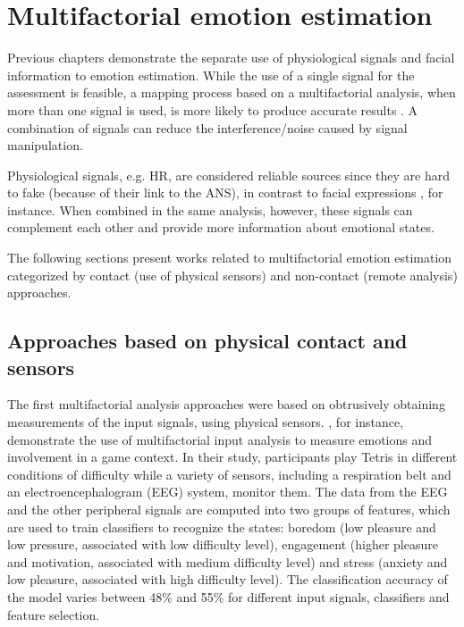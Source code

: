 \chapter{Multifactorial emotion estimation}
\label{ch:literature-multifactorial}

Previous chapters demonstrate the separate use of physiological signals and facial information to emotion estimation. While the use of a single signal for the assessment is feasible, a mapping process based on a multifactorial analysis, when more than one signal is used, is more likely to produce accurate results \parencite{kukolja2014comparative}. A combination of signals can reduce the interference/noise caused by signal manipulation.

Physiological signals, e.g. HR, are considered reliable sources since they are hard to fake (because of their link to the ANS), in contrast to facial expressions \parencite{Landowska}, for instance. When combined in the same analysis, however, these signals can complement each other and provide more information about emotional states.

The following sections present works related to multifactorial emotion estimation categorized by contact (use of physical sensors) and non-contact (remote analysis) approaches.

\section{\sloppy Approaches based on physical contact and sensors}

The first multifactorial analysis approaches were based on obtrusively obtaining measurements of the input signals, using physical sensors. \textcite{Chanel_2011}, for instance, demonstrate the use of multifactorial input analysis to measure emotions and involvement in a game context. In their study, participants play Tetris in different conditions of difficulty while a variety of sensors, including a respiration belt and an electroencephalogram (EEG) system, monitor them. The data from the EEG and the other peripheral signals are computed into two groups of features, which are used to train classifiers to recognize the states: boredom (low pleasure and low pressure, associated with low difficulty level), engagement (higher pleasure and motivation, associated with medium difficulty level) and stress (anxiety and low pleasure, associated with high difficulty level). The classification accuracy of the model varies between 48\% and 55\% for different input signals, classifiers and feature selection.

